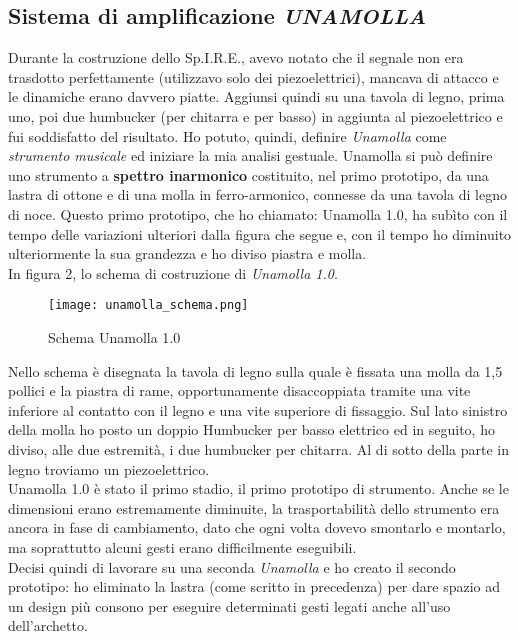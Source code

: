 \subsection{Sistema di amplificazione \textit{UNAMOLLA}}

Durante la costruzione dello Sp.I.R.E., avevo notato che il segnale non era trasdotto perfettamente (utilizzavo solo dei piezoelettrici), mancava di attacco e le dinamiche erano davvero piatte. Aggiunsi quindi su una tavola di legno, prima uno, poi due humbucker (per chitarra e per basso) in aggiunta al piezoelettrico e fui soddisfatto del risultato. Ho potuto, quindi, definire \textit{Unamolla} come \textit{strumento musicale} ed iniziare la mia analisi gestuale.
Unamolla si può definire uno strumento a \textbf{spettro inarmonico} costituito, nel primo prototipo, da una lastra di ottone e di una molla in ferro-armonico, connesse da una tavola di legno di noce. Questo primo prototipo, che ho chiamato: Unamolla 1.0, ha subìto con il tempo delle variazioni ulteriori dalla figura che segue e, con il tempo ho diminuito ulteriormente la sua grandezza e ho diviso piastra e molla. \\
In figura 2, lo schema di costruzione di \textit{Unamolla 1.0}.

\begin{figure}

\begin{center}

\texttt{[image: unamolla\_schema.png]}

\caption{Schema Unamolla 1.0}

\label{fig:02_unamolla_01}

\end{center}

\end{figure}


Nello schema è disegnata la tavola di legno sulla quale è fissata una molla da 1,5 pollici e la piastra di rame, opportunamente disaccoppiata tramite una vite inferiore al contatto con il legno e una vite superiore di fissaggio. Sul lato sinistro della molla ho posto un doppio Humbucker per basso elettrico ed in seguito, ho diviso, alle due estremità, i due humbucker per chitarra. Al di sotto della parte in legno troviamo un piezoelettrico. \\
Unamolla 1.0 è stato il primo stadio, il primo prototipo di strumento. Anche se le dimensioni erano estremamente diminuite, la trasportabilità dello strumento era ancora in fase di cambiamento, dato che ogni volta dovevo smontarlo e montarlo, ma soprattutto alcuni gesti erano difficilmente eseguibili. \\
Decisi quindi di lavorare su una seconda \textit{Unamolla}  e ho creato il secondo prototipo: ho eliminato la lastra (come scritto in precedenza) per dare spazio ad un design più consono per eseguire determinati gesti legati anche all’uso dell’archetto. 

